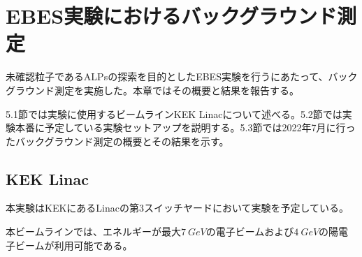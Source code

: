 
\chapter{EBES実験におけるバックグラウンド測定} \label{sec:EBES}
未確認粒子であるALPsの探索を目的としたEBES実験を行うにあたって、バックグラウンド測定を実施した。本章ではその概要と結果を報告する。

5.1節では実験に使用するビームラインKEK Linacについて述べる。5.2節では実験本番に予定している実験セットアップを説明する。5.3節では2022年7月に行ったバックグラウンド測定の概要とその結果を示す。

\section{KEK Linac}
本実験はKEKにあるLinacの第3スイッチヤードにおいて実験を予定している。

本ビームラインでは、エネルギーが最大$\SI{7}{GeV}$の電子ビームおよび$\SI{4}{GeV}$の陽電子ビームが利用可能である。%

